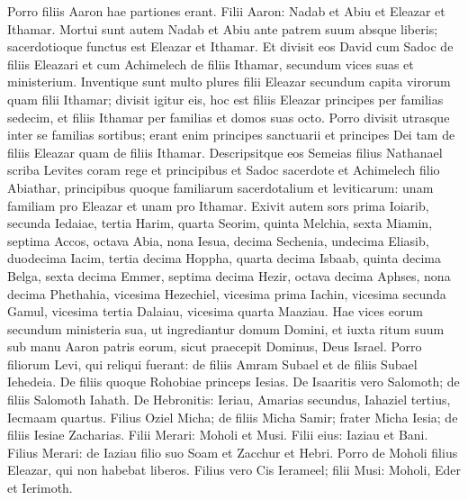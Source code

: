 \begin{biblechapter}
\begin{biblechapter}
\begin{biblechapter}
\begin{biblechapter}
\begin{biblechapter}
\begin{biblechapter}
\begin{biblechapter}
\begin{biblechapter}
\begin{biblechapter}
\begin{biblechapter}
\begin{biblechapter}
\begin{biblechapter}
\begin{biblechapter}
\begin{biblechapter}
\begin{biblechapter}
\begin{biblechapter}
\begin{biblechapter}
\begin{biblechapter}
\begin{biblechapter}
\begin{biblechapter}
\begin{biblechapter}
\begin{biblechapter}
\begin{biblechapter}
\begin{biblechapter}
\verse Porro filiis Aaron hae partiones erant.
 Filii Aaron: Nadab et Abiu et Eleazar et Ithamar. 
\verse Mortui sunt autem Nadab et Abiu ante patrem suum absque liberis; sacerdotioque functus est Eleazar et Ithamar.
 \verse Et divisit eos David cum Sadoc de filiis Eleazari et cum Achimelech de filiis Ithamar, secundum vices suas et ministerium. 
\verse Inventique sunt multo plures filii Eleazar secundum capita virorum quam filii Ithamar; divisit igitur eis, hoc est filiis Eleazar principes per familias sedecim, et filiis Ithamar per familias et domos suas octo. 
\verse Porro divisit utrasque inter se familias sortibus; erant enim principes sanctuarii et principes Dei tam de filiis Eleazar quam de filiis Ithamar. 
\verse Descripsitque eos Semeias filius Nathanael scriba Levites coram rege et principibus et Sadoc sacerdote et Achimelech filio Abiathar, principibus quoque familiarum sacerdotalium et leviticarum: unam familiam pro Eleazar et unam pro Ithamar.
 \verse Exivit autem sors prima Ioiarib, secunda Iedaiae, 
\verse tertia Harim, quarta Seorim, 
\verse quinta Melchia, sexta Miamin, 
\verse septima Accos, octava Abia, 
 \verse nona Iesua, decima Sechenia, 
\verse undecima Eliasib, duodecima Iacim, 
\verse tertia decima Hoppha, quarta decima Isbaab, 
\verse quinta decima Belga, sexta decima Emmer, 
\verse septima decima Hezir, octava decima Aphses, 
\verse nona decima Phethahia, vicesima Hezechiel, 
\verse vicesima prima Iachin, vicesima secunda Gamul, 
\verse vicesima tertia Dalaiau, vicesima quarta Maaziau.
 \verse Hae vices eorum secundum ministeria sua, ut ingrediantur domum Domini, et iuxta ritum suum sub manu Aaron patris eorum, sicut praecepit Dominus, Deus Israel.
 \verse Porro filiorum Levi, qui reliqui fuerant: de filiis Amram Subael et de filiis Subael Iehedeia. 
\verse De filiis quoque Rohobiae princeps Iesias. 
\verse De Isaaritis vero Salomoth; de filiis Salomoth Iahath. 
\verse De Hebronitis: Ieriau, Amarias secundus, Iahaziel tertius, Iecmaam quartus. 
\verse Filius Oziel Micha; de filiis Micha Samir; 
\verse frater Micha Iesia; de filiis Iesiae Zacharias. 
\verse Filii Merari: Moholi et Musi. Filii eius: Iaziau et Bani. 
 \verse Filius Merari: de Iaziau filio suo Soam et Zacchur et Hebri. 
\verse Porro de Moholi filius Eleazar, qui non habebat liberos. 
\verse Filius vero Cis Ierameel; 
 \verse filii Musi: Moholi, Eder et Ierimoth.

\end{biblechapter}
\end{biblechapter}
\end{biblechapter}
\end{biblechapter}
\end{biblechapter}
\end{biblechapter}
\end{biblechapter}
\end{biblechapter}
\end{biblechapter}
\end{biblechapter}
\end{biblechapter}
\end{biblechapter}
\end{biblechapter}
\end{biblechapter}
\end{biblechapter}
\end{biblechapter}
\end{biblechapter}
\end{biblechapter}
\end{biblechapter}
\end{biblechapter}
\end{biblechapter}
\end{biblechapter}
\end{biblechapter}
\end{biblechapter}
